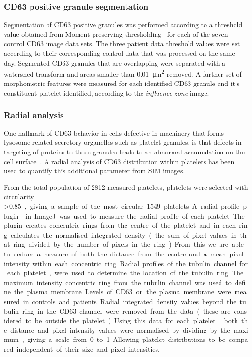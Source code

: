 \subsubsection{CD63 positive granule segmentation}
Segmentation of CD63 positive granules was performed according to a threshold value obtained from Moment-preserving thresholding~\cite{Tsai1985} for each of the seven control CD63 image data sets. The three patient data threshold values were set according to their corresponding control data that was processed on the same day. Segmented CD63 granules that are overlapping were separated with a watershed transform and areas smaller than \SI{0.01}{\micro\meter\squared} removed. A further set of morphometric features were measured for each identified CD63 granule and it's constituent platelet identified, according to the \emph{influence zone} image.

\subsubsection{Radial analysis}
One hallmark of CD63 behavior in cells defective in machinery that forms lysosome-related secretory organelles such as platelet granules, is that defects in targeting of proteins to those granules leads to an abnormal accumulation on the cell surface~\cite{DellAngelica1999}. A radial analysis of CD63 distribution within platelets has been used to quantify this additional parameter from SIM images.

From the total population of 2812 measured platelets, platelets were selected with circularity \textgreater\SI{0.85}, giving a sample of the most circular 1549 platelets.  A radial profile plugin~\cite{Baggethun2001} in ImageJ was used to measure the radial profile of each platelet. The plugin creates concentric rings from the centre of the platelet and in each ring calculates the normalised integrated density (the sum of pixel values in that ring divided by the number of pixels in the ring). From this we are able to deduce a measure of both the distance from the centre and a mean pixel intensity within each concentric ring.

Radial profiles of the tubulin channel for each platelet, were used to determine the location of the tubulin ring. The maximum intensity concentric ring from the tubulin channel was used to define the plasma membrane. Levels of CD63 on the plasma membrane were measured in controls and patients. Radial integrated density values beyond the tubulin ring in the CD63 channel were removed from the data (these are considered to be outside the platelet). Using this data for each platelet, both the distance and pixel intensity values were normalised by dividing by the maximum, giving a scale from 0 to 1. Allowing platelet distributions to be compared independent of their size and pixel intensities.

